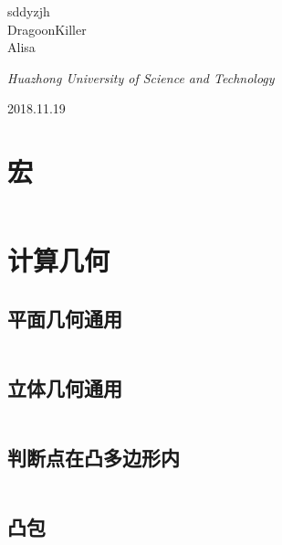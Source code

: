 \documentclass[UTF8]{ctexart}
\begin{document}
\begin{titlepage}
	{\protect sddyzjh \\ DragoonKiller \\ Alisa \\} %

	\vspace{0.5\baselineskip} %

	\textit{Huazhong University of Science and Technology} %

	\vfill %


\date{\today}

	2018.11.19 %
\end{titlepage}
\setcounter{secnumdepth}{0}

\tableofcontents

\newpage
{}

\section{宏}
\inputminted{cpp}{others/template.cpp}

\section{计算几何}

\subsection{平面几何通用}
\inputminted{cpp}{calcgeometry/平面几何通用.cpp}

\subsection{立体几何通用}
\inputminted{cpp}{calcgeometry/立体几何通用.cpp}

\subsection{判断点在凸多边形内}
\inputminted{cpp}{calcgeometry/判断点在凸多边形内.cpp}

\subsection{凸包}
\inputminted{cpp}{calcgeometry/凸包.cpp}
\end{document}
